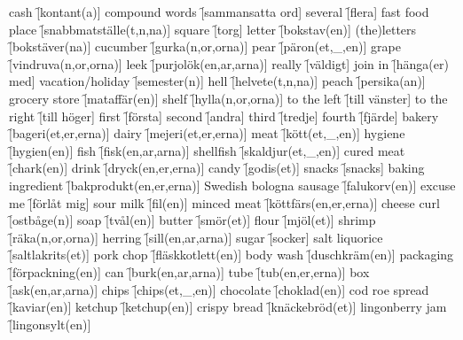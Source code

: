 \begin{questions}
\begin{multicols}{2}
        \question cash \f[kontant(a)]
        \question compound words \f[sammansatta ord]
        \question several \f[flera]
        \question fast food place \f[snabbmatställe(t,n,na)]
        \question square \f[torg]
        \question letter \f[bokstav(en)]
        \question (the)letters \f[bokstäver(na)]
        \question cucumber \f[gurka(n,or,orna)]
        \question pear \f[päron(et,\_,en)]
        \question grape \f[vindruva(n,or,orna)]
        \question leek \f[purjolök(en,ar,arna)]
        \question really \f[väldigt]
        \question join in \f[hänga(er) med]
        \question vacation/holiday \f[semester(n)]
        \question hell \f[helvete(t,n,na)]
        \question peach \f[persika(an)]
        \question grocery store \f[mataffär(en)]
        \question shelf \f[hylla(n,or,orna)]
        \question to the left \f[till vänster]
        \question to the right \f[till höger]
        \question first \f[första]
        \question second \f[andra]
        \question third \f[tredje]
        \question fourth \f[fjärde]
        \question bakery \f[bageri(et,er,erna)]
        \question dairy \f[mejeri(et,er,erna)]
        \question meat \f[kött(et,\_,en)]
        \question hygiene \f[hygien(en)]
        \question fish \f[fisk(en,ar,arna)]
        \question shellfish \f[skaldjur(et,\_,en)]
        \question cured meat \f[chark(en)]
        \question drink \f[dryck(en,er,erna)]
        \question candy \f[godis(et)]
        \question snacks \f[snacks]
        \question baking ingredient \f[bakprodukt(en,er,erna)]
        \question Swedish bologna sausage \f[falukorv(en)]
        \question excuse me \f[förlåt mig]
        \question sour milk \f[fil(en)]
        \question minced meat \f[köttfärs(en,er,erna)]
        \question cheese curl \f[ostbåge(n)]
        \question soap \f[tvål(en)]
        \question butter \f[smör(et)]
        \question flour \f[mjöl(et)]
        \question shrimp \f[räka(n,or,orna)]
        \question herring \f[sill(en,ar,arna)]
        \question sugar \f[socker]
        \question salt liquorice \f[saltlakrits(et)]
        \question pork chop \f[fläskkotlett(en)]
        \question body wash \f[duschkräm(en)]
        \question packaging \f[förpackning(en)]
        \question can \f[burk(en,ar,arna)]
        \question tube \f[tub(en,er,erna)]
        \question box \f[ask(en,ar,arna)]
        \question chips \f[chips(et,\_,en)]
        \question chocolate \f[choklad(en)]
        \question cod roe spread \f[kaviar(en)]
        \question ketchup \f[ketchup(en)]
        \question crispy bread \f[knäckebröd(et)]
        \question lingonberry jam \f[lingonsylt(en)]

\end{multicols}
\end{questions}

